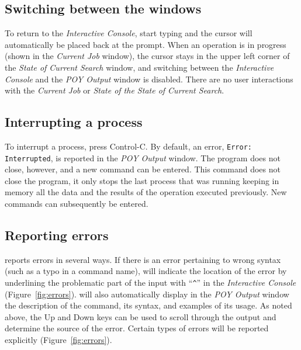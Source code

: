 \subsection{Switching between the windows}
To return to the \emph{Interactive Console}, start typing and the cursor will automatically be placed back at the \poy prompt. When an operation is in progress (shown in the \emph{Current Job} window), the cursor stays in the upper left corner of the \emph{State of Current Search} window, and switching between the \emph{Interactive Console} and the \emph{POY Output} window is disabled. There are no user interactions with the \emph{Current Job} or \emph{State of the State of Current Search}.

\subsection{Interrupting a process}
To interrupt a process, press Control-C. By default, an error, \texttt{Error:}\\ \texttt{Interrupted}, is reported in the \emph{POY Output} window. The program does not close, however, and a new command can be entered. This command does not close the program, it only stops the last process that was running keeping in memory all the data and the results of the operation executed previously. New commands can subsequently be entered.

\subsection{Reporting errors}
\poy reports errors in several ways. If there is an error pertaining to wrong syntax (such as a typo in a command name), \poy will indicate the location of the error by underlining the problematic part of the input with ``\texttt{\^}'' in the \emph{Interactive Console} (Figure~\ref{fig:errors}). \poy will also automatically display in the \emph{POY Output} window the description of the command, its syntax, and examples of its usage. As noted above, the Up and Down keys can be used to scroll through the output and determine the source of the error. Certain types of errors will be reported explicitly (Figure~\ref{fig:errors}).

